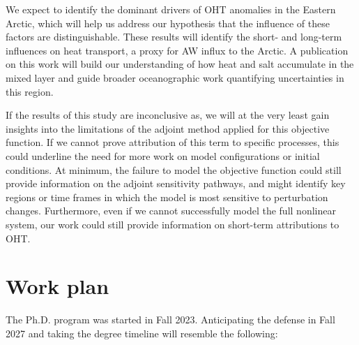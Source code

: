 \documentclass[a4paper,12pt]{article}
\begin{document}
    We expect to identify the dominant drivers of OHT anomalies in the Eastern Arctic, which will help us address our hypothesis that the influence of these factors are distinguishable. These results will identify the short- and long-term influences on heat transport, a proxy for AW influx to the Arctic. A publication on this work will build our understanding of how heat and salt accumulate in the mixed layer and guide broader oceanographic work quantifying uncertainties in this region.

    If the results of this study are inconclusive as, we will at the very least gain insights into the limitations of the adjoint method applied for this objective function. If we cannot prove attribution of this term to specific processes, this could underline the need for more work on model configurations or initial conditions. At minimum, the failure to model the objective function could still provide information on the adjoint sensitivity pathways, and might identify key regions or time frames in which the model is most sensitive to perturbation changes. Furthermore, even if we cannot successfully model the full nonlinear system, our work could still provide information on short-term attributions to OHT.

    
	
     
    

    \section{Work plan}
    The Ph.D. program was started in Fall 2023. Anticipating the defense in Fall 2027 and taking  the degree timeline will resemble the following:
\end{document}
